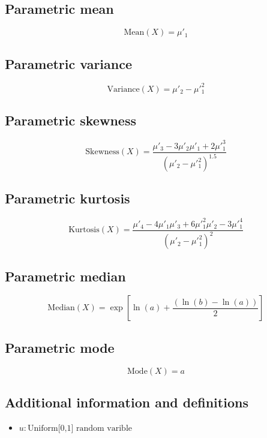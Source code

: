 \documentclass{article}
\begin{document}
\subsection{Parametric mean}
\begin{equation*} \mathrm{Mean}(X)=\mu'_{1} \end{equation*}
\subsection{Parametric variance}
\begin{equation*} \mathrm{Variance}(X)=\mu'_{2}-\mu'^{2}_{1} \end{equation*}
\subsection{Parametric skewness}
\begin{equation*} \mathrm{Skewness}(X)=\frac{\mu'_{3}-3\mu'_{2}\mu'_{1}+2\mu'^{3}_{1}}{(\mu'_{2}-\mu'^{2}_{1})^{1.5}} \end{equation*}
\subsection{Parametric kurtosis}
\begin{equation*} \mathrm{Kurtosis}(X)=\frac{\mu'_{4}-4\mu'_{1}\mu'_{3}+6\mu'^{2}_{1}\mu'_{2}-3\mu'^{4}_{1}}{(\mu'_{2}-\mu'^{2}_{1})^{2}} \end{equation*}
\subsection{Parametric median}
\begin{equation*} \mathrm{Median}(X)=\exp\left[\ln(a)+\frac{\left(\ln(b)-\ln(a)\right)}{2}\right] \end{equation*}
\subsection{Parametric mode}
\begin{equation*} \mathrm{Mode}(X)=a \end{equation*}
\subsection{Additional information and definitions}
\begin{itemize}
    \item $ u:\text{Uniform[0,1] random varible} $
\end{itemize}
\end{document}
